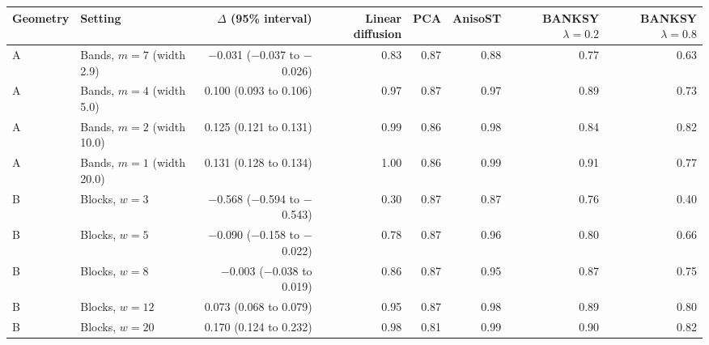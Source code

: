 \begin{tabular}{llrrrrrr}
\toprule
Geometry & Setting & $\Delta$ (95\% interval) & Linear diffusion & PCA & AnisoST & BANKSY $\lambda=0.2$ & BANKSY $\lambda=0.8$ \\
\midrule
A & Bands, $m=7$ (width 2.9) & $-$0.031 ($-$0.037 to $-$0.026) & 0.83 & 0.87 & 0.88 & 0.77 & 0.63 \\
A & Bands, $m=4$ (width 5.0) & 0.100 (0.093 to 0.106) & 0.97 & 0.87 & 0.97 & 0.89 & 0.73 \\
A & Bands, $m=2$ (width 10.0) & 0.125 (0.121 to 0.131) & 0.99 & 0.86 & 0.98 & 0.84 & 0.82 \\
A & Bands, $m=1$ (width 20.0) & 0.131 (0.128 to 0.134) & 1.00 & 0.86 & 0.99 & 0.91 & 0.77 \\
B & Blocks, $w=3$ & $-$0.568 ($-$0.594 to $-$0.543) & 0.30 & 0.87 & 0.87 & 0.76 & 0.40 \\
B & Blocks, $w=5$ & $-$0.090 ($-$0.158 to $-$0.022) & 0.78 & 0.87 & 0.96 & 0.80 & 0.66 \\
B & Blocks, $w=8$ & $-$0.003 ($-$0.038 to 0.019) & 0.86 & 0.87 & 0.95 & 0.87 & 0.75 \\
B & Blocks, $w=12$ & 0.073 (0.068 to 0.079) & 0.95 & 0.87 & 0.98 & 0.89 & 0.80 \\
B & Blocks, $w=20$ & 0.170 (0.124 to 0.232) & 0.98 & 0.81 & 0.99 & 0.90 & 0.82 \\
\bottomrule
\end{tabular}
